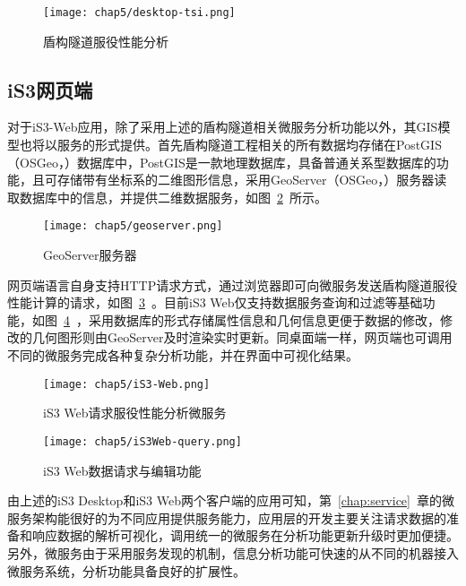 \begin{figure}[htb!]
    \centering
    \texttt{[image: chap5/desktop-tsi.png]}
    \caption{盾构隧道服役性能分析}
    \label{fig:盾构隧道服役性能分析}
\end{figure}

\subsection{iS3网页端}

对于iS3-Web应用，除了采用上述的盾构隧道相关微服务分析功能以外，其GIS模型也将以服务的形式提供。首先盾构隧道工程相关的所有数据均存储在PostGIS（OSGeo，\citeyear{postgis2018}）数据库中，PostGIS是一款地理数据库，具备普通关系型数据库的功能，且可存储带有坐标系的二维图形信息，采用GeoServer（OSGeo，\citeyear{geoserver2018}）服务器读取数据库中的信息，并提供二维数据服务，如图~\ref{fig:GeoServer服务器}~所示。

\begin{figure}[htb!]
    \centering
    \texttt{[image: chap5/geoserver.png]}
    \caption{GeoServer服务器}
    \label{fig:GeoServer服务器}
\end{figure}

网页端语言自身支持HTTP请求方式，通过浏览器即可向微服务发送盾构隧道服役性能计算的请求，如图~\ref{fig:iS3Web请求服役性能分析微服务}~。目前iS3 Web仅支持数据服务查询和过滤等基础功能，如图~\ref{fig:iS3Web数据请求与编辑功能}~，采用数据库的形式存储属性信息和几何信息更便于数据的修改，修改的几何图形则由GeoServer及时渲染实时更新。同桌面端一样，网页端也可调用不同的微服务完成各种复杂分析功能，并在界面中可视化结果。

\begin{figure}[htb!]
    \centering
    \texttt{[image: chap5/iS3-Web.png]}
    \caption{iS3 Web请求服役性能分析微服务}
    \label{fig:iS3Web请求服役性能分析微服务}
\end{figure}

\begin{figure}[htb!]
    \centering
    \texttt{[image: chap5/iS3Web-query.png]}
    \caption{iS3 Web数据请求与编辑功能}
    \label{fig:iS3Web数据请求与编辑功能}
\end{figure}

由上述的iS3 Desktop和iS3 Web两个客户端的应用可知，第~\ref{chap:service}~章的微服务架构能很好的为不同应用提供服务能力，应用层的开发主要关注请求数据的准备和响应数据的解析可视化，调用统一的微服务在分析功能更新升级时更加便捷。另外，微服务由于采用服务发现的机制，信息分析功能可快速的从不同的机器接入微服务系统，分析功能具备良好的扩展性。

